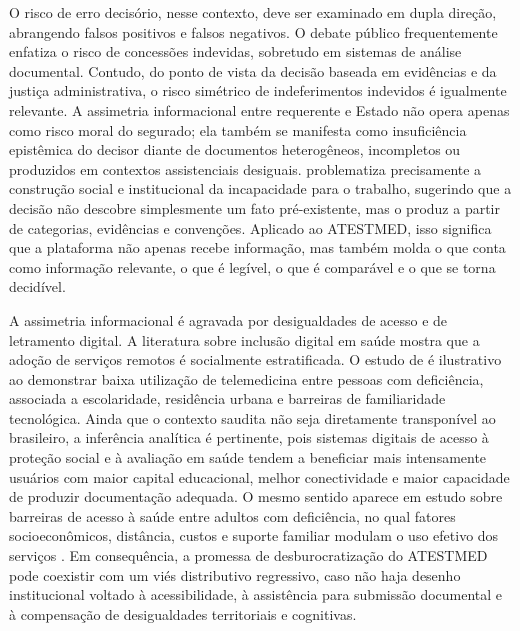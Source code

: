 \documentclass[12pt,a4paper]{article}
\begin{document}
O risco de erro decisório, nesse contexto, deve ser examinado em dupla direção, abrangendo falsos positivos e falsos negativos. O debate público frequentemente enfatiza o risco de concessões indevidas, sobretudo em sistemas de análise documental. Contudo, do ponto de vista da decisão baseada em evidências e da justiça administrativa, o risco simétrico de indeferimentos indevidos é igualmente relevante. A assimetria informacional entre requerente e Estado não opera apenas como risco moral do segurado; ela também se manifesta como insuficiência epistêmica do decisor diante de documentos heterogêneos, incompletos ou produzidos em contextos assistenciais desiguais. \textcite{dijkstrasdatamakingupincapacityforwork} problematiza precisamente a construção social e institucional da incapacidade para o trabalho, sugerindo que a decisão não descobre simplesmente um fato pré-existente, mas o produz a partir de categorias, evidências e convenções. Aplicado ao ATESTMED, isso significa que a plataforma não apenas recebe informação, mas também molda o que conta como informação relevante, o que é legível, o que é comparável e o que se torna decidível.

A assimetria informacional é agravada por desigualdades de acesso e de letramento digital. A literatura sobre inclusão digital em saúde mostra que a adoção de serviços remotos é socialmente estratificada. O estudo de \textcite{albasheer2026telemedicineutilizationanddigitalinclusionamongpe} é ilustrativo ao demonstrar baixa utilização de telemedicina entre pessoas com deficiência, associada a escolaridade, residência urbana e barreiras de familiaridade tecnológica. Ainda que o contexto saudita não seja diretamente transponível ao brasileiro, a inferência analítica é pertinente, pois sistemas digitais de acesso à proteção social e à avaliação em saúde tendem a beneficiar mais intensamente usuários com maior capital educacional, melhor conectividade e maior capacidade de produzir documentação adequada. O mesmo sentido aparece em estudo sobre barreiras de acesso à saúde entre adultos com deficiência, no qual fatores socioeconômicos, distância, custos e suporte familiar modulam o uso efetivo dos serviços \parencite{m2024astudyofdisabilityseveritybarriersandfacilitatingfactor}. Em consequência, a promessa de desburocratização do ATESTMED pode coexistir com um viés distributivo regressivo, caso não haja desenho institucional voltado à acessibilidade, à assistência para submissão documental e à compensação de desigualdades territoriais e cognitivas.
\end{document}
